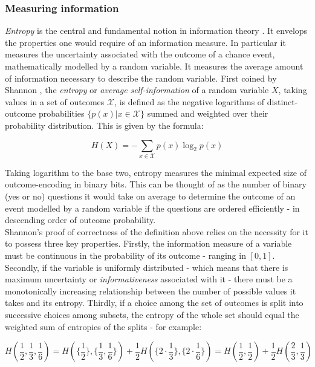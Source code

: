 \documentclass[12pt]{extarticle}
\begin{document}
\subsubsection*{Measuring information}
\noindent \textit{Entropy} is the central and fundamental notion in
information theory \cite{Thomas}. It envelops the properties one would
require of an information measure. In particular it measures the
uncertainty associated with the outcome of a chance event,
mathematically modelled by a random variable. It measures the average
amount of information necessary to describe the random variable. First
coined by Shannon \cite{Shannon}, the \textit{entropy} or
\textit{average self-information} of a random variable $X$, taking
values in a set of outcomes $\mathcal{X}$, is defined as the negative
logarithms of distinct-outcome probabilities
$\{p(x)|x\in\mathcal{X}\}$ summed and weighted over their probability
distribution. This is given by the formula:

\begin{equation} 
H(X)=-\sum_{x \in \mathcal{X}} p(x)\log_2 p(x)
\label{eq.entropy.1}
\end{equation}

\noindent
Taking logarithm to the base two, entropy measures the minimal expected size
of outcome-encoding in binary bits.
This can be thought of as the number of binary (yes or no) questions
it would take on average to determine the outcome of an event modelled
by a random variable if the questions are ordered efficiently - in
descending order of outcome probability.\\

\noindent
Shannon's proof of correctness of the definition above
relies on the necessity for it to possess three key
properties. Firstly, the information measure of a variable must be
continuous in the probability of its outcome - ranging in
$\left[0,1\right]$. Secondly, if the variable is uniformly distributed
- which means that there is maximum uncertainty or \textit{informativeness} associated with it - there must be a monotonically increasing relationship between the
number of possible values it takes and its entropy. Thirdly, if a
choice among the set of outcomes is split into successive choices
among subsets, the entropy of the whole set should equal the weighted
sum of entropies of the splits - for example:

\begin{equation}
H(\frac{1}{2},\frac{1}{3},\frac{1}{6})=H(\{\frac{1}{2}\},\{\frac{1}{3},\frac{1}{6}\})+\frac{1}{2}H(\{2\cdot\frac{1}{3}\},\{2\cdot\frac{1}{6}\})=H(\frac{1}{2},\frac{1}{2})+\frac{1}{2}H(\frac{2}{3},\frac{1}{3})
\end{equation}
\end{document}
